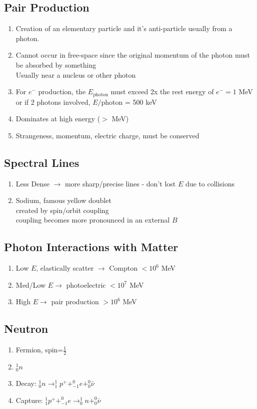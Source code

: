 \documentclass[10pt,letter]{article}
\begin{document}
\subsection{Pair Production}
\begin{enumerate}
    \item Creation of an elementary particle and it's anti-particle usually from a photon.
    \item Cannot occur in free-space since the original momentum of the photon must be absorbed by something\\
    Usually near a nucleus or other photon
    \item For $e^-$ production, the $E_{\textrm{photon}}$ must exceed 2x the rest energy of $e^- = 1$ MeV or if 2 photons involved, $E/$photon = 500 keV
    \item Dominates at high energy ($>$ MeV)
    \item Strangeness, momentum, electric charge, must be conserved
\end{enumerate}

\subsection{Spectral Lines}
\begin{enumerate}
    \item Less Dense $\rightarrow $ more sharp/precise lines - don't lost $E$ due to collisions
    \item Sodium, famous yellow doublet\\
        created by spin/orbit coupling\\
        coupling becomes more pronounced in an external $B$
\end{enumerate}

\subsection{Photon Interactions with Matter}
\begin{enumerate}
    \item Low $E$, elastically scatter $\rightarrow$ Compton   $<10^6$ MeV
    \item Med/Low $E \rightarrow$ photoelectric         $<10^7$ MeV
    \item High $E \rightarrow$ pair production      $>10^6$ MeV
\end{enumerate}

\subsection{Neutron}
\begin{enumerate}
    \item Fermion, spin=$\frac{1}{2}$
    \item $^1_0n$
    \item Decay: $^1_0n \rightarrow ^1_1p^+ + ^0_{-1}e + ^0_0\bar{\nu}$
    \item Capture: $^1_1p^+ + ^0_{-1}e \rightarrow ^1_0n + ^0_0 \bar{\nu}$
\end{enumerate}
\end{document}
